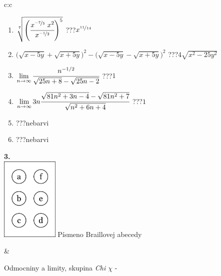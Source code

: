 \documentclass[10pt]{report}
\begin{document}
\begin{tabular}{c:c}
\begin{minipage}[c][104.5mm][t]{0.5\linewidth}
\begin{center}
\begin{minipage}{0.79\linewidth}
\begin{center}
\begin{varwidth}{\linewidth}
\begin{enumerate}
\small
\item $\sqrt[7]{\left(\cfrac{x^{\nicefrac{-7}{5}}\;x^{2}}{x^{\nicefrac{-1}{2}}}\right)^{5}}$\quad \dotfill\; ???\;\dotfill \quad $x^{\nicefrac{11}{14}}$
\item {\footnotesize{\scriptsize$\big(\sqrt{x-5y}+\sqrt{x+5y}\big)^2-\big(\sqrt{x-5y}-\sqrt{x+5y}\big)^2$}\quad \dotfill\; ???\;\dotfill \quad $4\sqrt{x^2-25y^2}$}
\item $\lim\limits_{n\to\infty}\cfrac{n^{-1/2}}{\sqrt{25n+8}-\sqrt{25n-2}}$\quad \dotfill\; ???\;\dotfill \quad $1$
\item $\lim\limits_{n\to\infty}3n\cfrac{\sqrt{81n^2+3n-4}-\sqrt{81n^2+7}}{\sqrt{n^2+6n+4}}$\quad \dotfill\; ???\;\dotfill \quad $1$
\item \quad \dotfill\; ???\;\dotfill \quad nebarvi
\item \quad \dotfill\; ???\;\dotfill \quad nebarvi
\end{enumerate}
\end{varwidth}
\end{center}
\end{minipage}
\begin{minipage}{0.20\linewidth}
\begin{center}
{\Huge\bfseries 3.} \\[2mm]
\includegraphics[height=40mm]{../images/braille.png}
{\small Písmeno Braillovej abecedy}
\end{center}
\end{minipage}
\end{center}
\end{minipage}
&
\begin{minipage}[c][104.5mm][t]{0.5\linewidth}
\begin{center}
\vspace{7mm}
{\huge Odmocniny a limity, skupina \textit{Chi $\chi$} -}\\[5mm]

\end{center}
\end{minipage}
\end{tabular}
\end{document}
